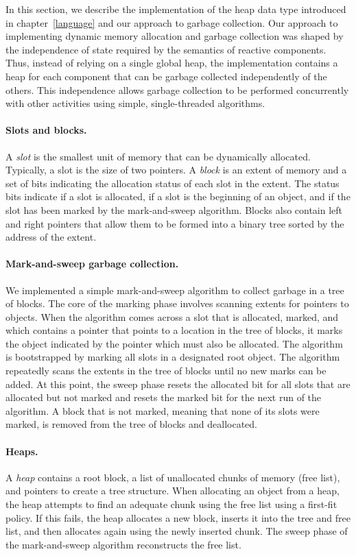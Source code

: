 In this section, we describe the implementation of the heap data type introduced in chapter~\ref{language} and our approach to garbage collection.
Our approach to implementing dynamic memory allocation and garbage collection was shaped by the independence of state required by the semantics of reactive components.
Thus, instead of relying on a single global heap, the implementation contains a heap for each component that can be garbage collected independently of the others.
This independence allows garbage collection to be performed concurrently with other activities using simple, single-threaded algorithms.

\paragraph{Slots and blocks.}
A \emph{slot} is the smallest unit of memory that can be dynamically allocated.
Typically, a slot is the size of two pointers.
A \emph{block} is an extent of memory and a set of bits indicating the allocation status of each slot in the extent.
The status bits indicate if a slot is allocated, if a slot is the beginning of an object, and if the slot has been marked by the mark-and-sweep algorithm.
Blocks also contain left and right pointers that allow them to be formed into a binary tree sorted by the address of the extent.

\paragraph{Mark-and-sweep garbage collection.}
We implemented a simple mark-and-sweep algorithm to collect garbage in a tree of blocks.
The core of the marking phase involves scanning extents for pointers to objects.
When the algorithm comes across a slot that is allocated, marked, and which contains a pointer that points to a location in the tree of blocks, it marks the object indicated by the pointer which must also be allocated.
The algorithm is bootstrapped by marking all slots in a designated root object.
The algorithm repeatedly scans the extents in the tree of blocks until no new marks can be added.
At this point, the sweep phase resets the allocated bit for all slots that are allocated but not marked and resets the marked bit for the next run of the algorithm.
A block that is not marked, meaning that none of its slots were marked, is removed from the tree of blocks and deallocated.

\paragraph{Heaps.}
A \emph{heap} contains a root block, a list of unallocated chunks of memory (free list), and pointers to create a tree structure.
When allocating an object from a heap, the heap attempts to find an adequate chunk using the free list using a first-fit policy.
If this fails, the heap allocates a new block, inserts it into the tree and free list, and then allocates again using the newly inserted chunk.
The sweep phase of the mark-and-sweep algorithm reconstructs the free list.

